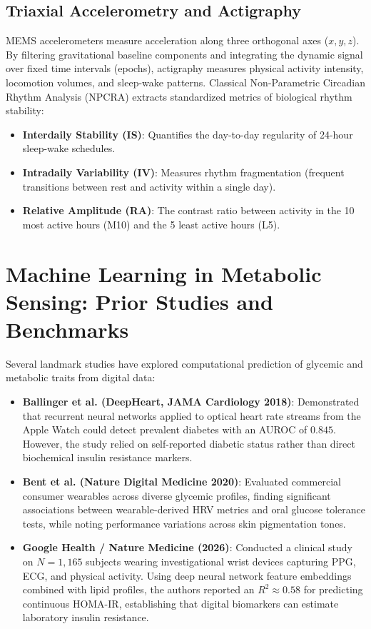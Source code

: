 \documentclass[12pt,a4paper,oneside]{report}
\begin{document}
\subsection{Triaxial Accelerometry and Actigraphy}
MEMS accelerometers measure acceleration along three orthogonal axes ($x, y, z$). By filtering gravitational baseline components and integrating the dynamic signal over fixed time intervals (epochs), actigraphy measures physical activity intensity, locomotion volumes, and sleep-wake patterns. Classical Non-Parametric Circadian Rhythm Analysis (NPCRA) extracts standardized metrics of biological rhythm stability:
\begin{itemize}
    \item \textbf{Interdaily Stability (IS)}: Quantifies the day-to-day regularity of 24-hour sleep-wake schedules.
    \item \textbf{Intradaily Variability (IV)}: Measures rhythm fragmentation (frequent transitions between rest and activity within a single day).
    \item \textbf{Relative Amplitude (RA)}: The contrast ratio between activity in the 10 most active hours (M10) and the 5 least active hours (L5).
\end{itemize}

\section{Machine Learning in Metabolic Sensing: Prior Studies and Benchmarks}
Several landmark studies have explored computational prediction of glycemic and metabolic traits from digital data:
\begin{itemize}
    \item \textbf{Ballinger et al. (DeepHeart, JAMA Cardiology 2018)}: Demonstrated that recurrent neural networks applied to optical heart rate streams from the Apple Watch could detect prevalent diabetes with an AUROC of $0.845$. However, the study relied on self-reported diabetic status rather than direct biochemical insulin resistance markers.
    \item \textbf{Bent et al. (Nature Digital Medicine 2020)}: Evaluated commercial consumer wearables across diverse glycemic profiles, finding significant associations between wearable-derived HRV metrics and oral glucose tolerance tests, while noting performance variations across skin pigmentation tones.
    \item \textbf{Google Health / Nature Medicine (2026)}: Conducted a clinical study on $N = 1,165$ subjects wearing investigational wrist devices capturing PPG, ECG, and physical activity. Using deep neural network feature embeddings combined with lipid profiles, the authors reported an $R^2 \approx 0.58$ for predicting continuous HOMA-IR, establishing that digital biomarkers can estimate laboratory insulin resistance.
\end{itemize}
\end{document}
